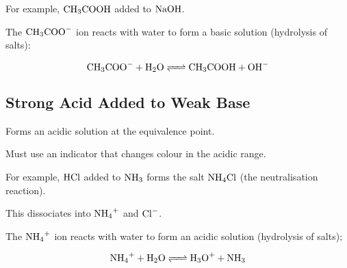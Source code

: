 \documentclass[a4paper,11pt]{article}
\begin{document}
For example, $\ce{CH3COOH}$ added to $\ce{NaOH}$.

The $\ce{CH3COO-}$ ion reacts with water to form a basic solution (hydrolysis
of salts):

$$
\ce{CH3COO- + H2O <=> CH3COOH + OH-}
$$


\subsection{Strong Acid Added to Weak Base}

Forms an acidic solution at the equivalence point.

Must use an indicator that changes colour in the acidic range.

For example, $\ce{HCl}$ added to $\ce{NH3}$ forms the salt $\ce{NH4Cl}$ (the
neutralisation reaction).

This dissociates into $\ce{NH4+}$ and $\ce{Cl-}$.

The $\ce{NH4+}$ ion reacts with water to form an acidic solution (hydrolysis
of salts);

$$
\ce{NH4+ + H2O <=> H3O+ + NH3}
$$
\end{document}
